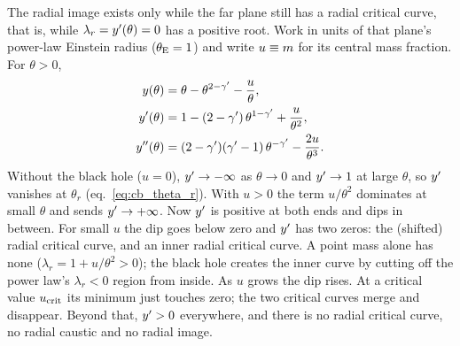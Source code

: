 The radial image exists only while the far plane still has a radial
critical curve, that is, while $\lambda_r=y'(\theta)=0$ has a
positive root. Work in units of that plane's power-law Einstein radius
($\theta_{\mathrm{E}}=1$) and write $u\equiv m$ for its central mass fraction. For
$\theta>0$,
\begin{align}
  y(\theta)   &= \theta - \theta^{2-\gamma'} - \frac{u}{\theta}, \notag\\
  y'(\theta)  &= 1 - (2-\gamma')\,\theta^{1-\gamma'} + \frac{u}{\theta^{2}},
  \label{eq:cb_yp}\\
  y''(\theta) &= (2-\gamma')(\gamma'-1)\,\theta^{-\gamma'} - \frac{2u}{\theta^{3}}.
  \label{eq:cb_ypp}
\end{align}
Without the black hole ($u=0$), $y'\to-\infty$ as $\theta\to0$ and
$y'\to1$ at large $\theta$, so $y'$ vanishes at $\theta_r$
(eq.~\eqref{eq:cb_theta_r}). With $u>0$ the term $u/\theta^2$ dominates
at small $\theta$ and sends $y'\to+\infty$. Now $y'$ is positive
at both ends and dips in between. For small $u$ the dip goes below zero
and $y'$ has two zeros: the (shifted) radial critical curve, and an
inner radial critical curve. A point mass alone has none
($\lambda_r=1+u/\theta^2>0$); the black hole creates the inner curve by
cutting off the power law's $\lambda_r<0$ region from inside. 
As $u$ grows the dip
rises. At a critical value $u_{\rm crit}$ its minimum just touches zero;
the two critical curves merge and disappear. Beyond that, $y'>0$
everywhere, and there is no radial critical curve, no radial caustic and
no radial image.

